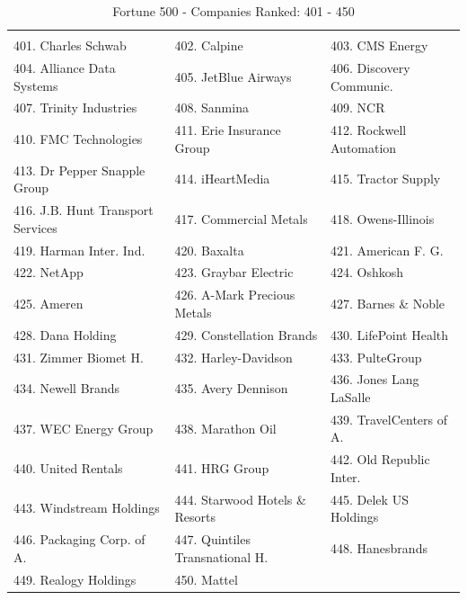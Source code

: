 \documentclass{article}
\begin{document}
\begin{table}[H]
\centering
\caption{Fortune 500 - Companies Ranked: 401 - 450}
\begin{tabular}{lll}
\hline
 \\ 401. Charles Schwab 
&  402. Calpine 
&  403. CMS Energy 
\\ 404. Alliance Data Systems 
&  405. JetBlue Airways 
&  406. Discovery Communic.
\\ 407. Trinity Industries 
&  408. Sanmina 
&  409. NCR 
\\ 410. FMC Technologies 
&  411. Erie Insurance Group 
&  412. Rockwell Automation 
\\ 413. Dr Pepper Snapple Group 
&  414. iHeartMedia 
&  415. Tractor Supply 
\\ 416. J.B. Hunt Transport Services 
&  417. Commercial Metals 
&  418. Owens-Illinois 
\\ 419. Harman Inter. Ind.
&  420. Baxalta 
&  421. American F. G.
\\ 422. NetApp 
&  423. Graybar Electric 
&  424. Oshkosh 
\\ 425. Ameren 
&  426. A-Mark Precious Metals 
&  427. Barnes \& Noble 
\\ 428. Dana Holding 
&  429. Constellation Brands 
&  430. LifePoint Health 
\\ 431. Zimmer Biomet H. 
&  432. Harley-Davidson 
&  433. PulteGroup 
\\ 434. Newell Brands 
&  435. Avery Dennison 
&  436. Jones Lang LaSalle 
\\ 437. WEC Energy Group 
&  438. Marathon Oil 
&  439. TravelCenters of A. 
\\ 440. United Rentals 
&  441. HRG Group 
&  442. Old Republic Inter. 
\\ 443. Windstream Holdings 
&  444. Starwood Hotels \& Resorts 
&  445. Delek US Holdings 
\\ 446. Packaging Corp. of A.
&  447. Quintiles Transnational H. 
&  448. Hanesbrands 
\\ 449. Realogy Holdings 
&  450. Mattel 
&   
 \\ \hline

\end{tabular}
\end{table}
\end{document}
